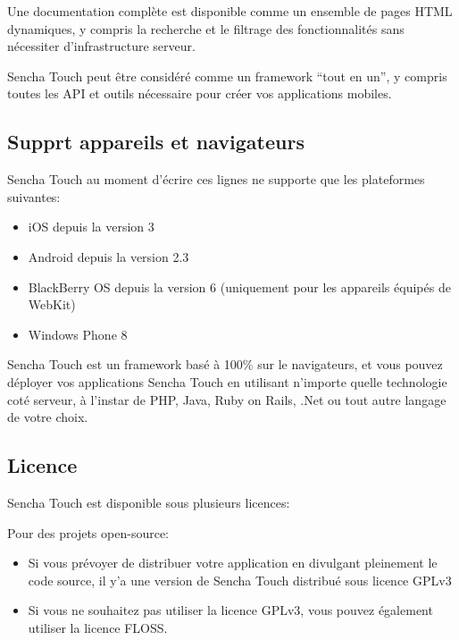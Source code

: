 Une documentation complète est disponible comme un ensemble de pages HTML dynamiques, y compris la recherche et le filtrage des fonctionnalités sans nécessiter d’infrastructure serveur.

Sencha Touch peut être considéré comme un framework “tout en un”, y compris toutes les API et outils nécessaire pour créer vos applications mobiles.



\subsection{Supprt appareils et navigateurs}

Sencha Touch au moment d’écrire ces lignes ne supporte que les plateformes suivantes:

\begin{itemize}

  \item[\textbullet]
  iOS depuis la version 3

  \item[\textbullet]
  Android depuis la version 2.3

  \item[\textbullet]
  BlackBerry OS depuis la version 6 (uniquement pour les appareils équipés de WebKit)

  \item[\textbullet]
  Windows Phone 8

\end{itemize}

Sencha Touch est un framework basé à 100\% sur le navigateurs, et vous pouvez déployer vos applications Sencha Touch en utilisant n’importe quelle technologie coté serveur, à l’instar de PHP, Java, Ruby on Rails, .Net ou tout autre langage de votre choix.


\subsection{Licence}

Sencha Touch est disponible sous plusieurs licences:

Pour des projets open-source:

\begin{itemize}

  \item[\textbullet]
  Si vous prévoyer de distribuer votre application en divulgant pleinement le code source, il y’a une version de Sencha Touch distribué sous licence GPLv3

  \item[\textbullet]
  Si vous ne souhaitez pas utiliser la licence GPLv3, vous pouvez également utiliser la licence FLOSS.
\end{itemize}




